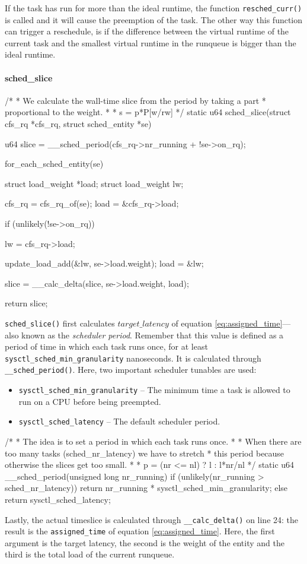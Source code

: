 If the task has run for more than the ideal runtime, the function \verb|resched_curr()| is called and it will cause the preemption of the task. The other way this function can trigger a reschedule, is if the difference between the virtual runtime of the current task and the smallest virtual runtime in the runqueue is bigger than the ideal runtime.

\paragraph{sched\_slice}
\begin{code}
/*
 * We calculate the wall-time slice from the period by taking a part
 * proportional to the weight.
 *
 * s = p*P[w/rw]
 */
static u64 sched_slice(struct cfs_rq *cfs_rq, struct sched_entity *se)
{
	u64 slice = __sched_period(cfs_rq->nr_running + !se->on_rq);

	for_each_sched_entity(se) {
		struct load_weight *load;
		struct load_weight lw;

		cfs_rq = cfs_rq_of(se);
		load = &cfs_rq->load;

		if (unlikely(!se->on_rq)) {
			lw = cfs_rq->load;

			update_load_add(&lw, se->load.weight);
			load = &lw;
		}
		slice = __calc_delta(slice, se->load.weight, load);
	}
	return slice;
}
\end{code}
\verb|sched_slice()| first calculates $target\_latency$ of equation \ref{eq:assigned_time}---also known as the \textit{scheduler period}. Remember that this value is defined as a period of time in which each task runs once, for at least \verb|sysctl_sched_min_granularity| nanoseconds. It is calculated through \verb|__sched_period()|.\label{sec:sched_period}
Here, two important scheduler tunables are used:
\begin{itemize}
    \item \verb|sysctl_sched_min_granularity| -- The minimum time a task is allowed to run on a CPU before being preempted.
    \item \verb|sysctl_sched_latency| -- The default scheduler period.
\end{itemize}
\begin{code}
/*
 * The idea is to set a period in which each task runs once.
 *
 * When there are too many tasks (sched_nr_latency) we have to stretch
 * this period because otherwise the slices get too small.
 *
 * p = (nr <= nl) ? l : l*nr/nl
 */
static u64 __sched_period(unsigned long nr_running)
{
	if (unlikely(nr_running > sched_nr_latency))
		return nr_running * sysctl_sched_min_granularity;
	else
		return sysctl_sched_latency;
}
\end{code}
Lastly, the actual timeslice is calculated through \verb|__calc_delta()| on line 24: the result is the \verb|assigned_time| of equation \ref{eq:assigned_time}. Here, the first argument is the target latency, the second is the weight of the entity and the third is the total load of the current runqueue.

